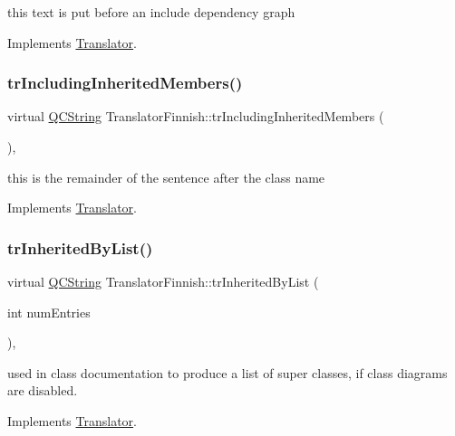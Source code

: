 this text is put before an include dependency graph 

Implements \mbox{\hyperlink{class_translator}{Translator}}.

\mbox{\label{class_translator_finnish_a1e3a3c73eed321022f01d3bbba776456}} 
\subsubsection{\texorpdfstring{trIncludingInheritedMembers()}{trIncludingInheritedMembers()}}
{\footnotesize\ttfamily virtual \mbox{\hyperlink{class_q_c_string}{Q\+C\+String}} Translator\+Finnish\+::tr\+Including\+Inherited\+Members (\begin{DoxyParamCaption}{ }\end{DoxyParamCaption})\hspace{0.3cm}{\ttfamily [inline]}, {\ttfamily [virtual]}}

this is the remainder of the sentence after the class name 

Implements \mbox{\hyperlink{class_translator}{Translator}}.

\mbox{\label{class_translator_finnish_a7961e7a65036d856695b35fcaac1519e}} 
\subsubsection{\texorpdfstring{trInheritedByList()}{trInheritedByList()}}
{\footnotesize\ttfamily virtual \mbox{\hyperlink{class_q_c_string}{Q\+C\+String}} Translator\+Finnish\+::tr\+Inherited\+By\+List (\begin{DoxyParamCaption}\item[{int}]{num\+Entries }\end{DoxyParamCaption})\hspace{0.3cm}{\ttfamily [inline]}, {\ttfamily [virtual]}}

used in class documentation to produce a list of super classes, if class diagrams are disabled. 

Implements \mbox{\hyperlink{class_translator}{Translator}}.

